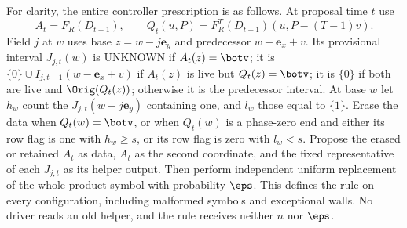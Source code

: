For clarity, the entire controller prescription is as follows. At proposal time $t$ use
\[
 A_t=F_R(D_{t-1}),\qquad
 Q_t(u,P)=F_R^T(D_{t-1})(u,P-(T-1)v).
\]
Field $j$ at $w$ uses base $z=w-j\mathbf e_y$ and predecessor $w-\mathbf e_x+v$. Its provisional interval $J_{j,t}(w)$ is UNKNOWN if $A_t(z)=\botv$; it is $\{0\}\cup I_{j,t-1}(w-\mathbf e_x+v)$ if $A_t(z)$ is live but $Q_t(z)=\botv$; it is $\{0\}$ if both are live and $\Orig(Q_t(z))$; otherwise it is the predecessor interval. At base $w$ let $h_w$ count the $J_{j,t}(w+j\mathbf e_y)$ containing one, and $l_w$ those equal to $\{1\}$. Erase the data when $Q_t(w)=\botv$, or when $Q_t(w)$ is a phase-zero end and either its row flag is one with $h_w\ge s$, or its row flag is zero with $l_w<s$. Propose the erased or retained $A_t$ as data, $A_t$ as the second coordinate, and the fixed representative of each $J_{j,t}$ as its helper output. Then perform independent uniform replacement of the whole product symbol with probability $\eps$. This defines the rule on every configuration, including malformed symbols and exceptional walls. No driver reads an old helper, and the rule receives neither $n$ nor $\eps$.

